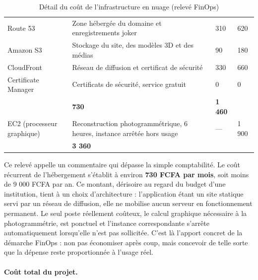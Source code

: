 \begin{table}[!ht]
\centering
\caption{Détail du coût de l'infrastructure en nuage (relevé FinOps)}
\label{tab:finops}
\small
\begin{tabularx}{\textwidth}{|L{3.8cm}|X|R{2.2cm}|R{2.2cm}|}
\hline
{}
 &  &  &  \\ \hline
Route 53 & Zone hébergée du domaine et enregistrements joker & 310 & 620 \\ \hline
Amazon S3 & Stockage du site, des modèles 3D et des médias & 90 & 180 \\ \hline
CloudFront & Réseau de diffusion et certificat de sécurité & 330 & 660 \\ \hline
Certificate Manager & Certificats de sécurité, service gratuit & 0 & 0 \\ \hline
{}
 & \textbf{730} & \textbf{1 460} \\ \hline
EC2 (processeur graphique) & Reconstruction photogrammétrique, 6 heures, instance arrêtée hors usage & — & 1 900 \\ \hline
{}
 & \textbf{3 360} \\ \hline
\end{tabularx}
\end{table}

Ce relevé appelle un commentaire qui dépasse la simple comptabilité. Le coût
récurrent de l'hébergement s'établit à environ \textbf{730 FCFA par mois}, soit
moins de 9 000 FCFA par an. Ce montant, dérisoire au regard du budget d'une
institution, tient à un choix d'architecture : l'application étant un site
statique servi par un réseau de diffusion, elle ne mobilise aucun serveur en
fonctionnement permanent. Le seul poste réellement coûteux, le calcul graphique
nécessaire à la photogrammétrie, est ponctuel et l'instance correspondante
s'arrête automatiquement lorsqu'elle n'est pas sollicitée. C'est là l'apport
concret de la démarche FinOps : non pas économiser après coup, mais concevoir de
telle sorte que la dépense reste proportionnée à l'usage réel.

\paragraph{Coût total du projet.}

